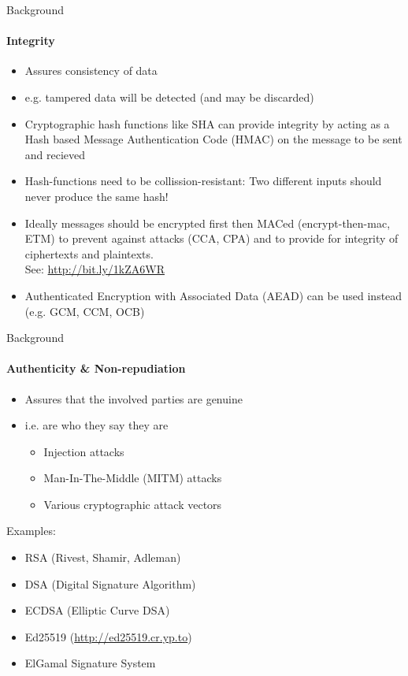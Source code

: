 \documentclass[hyperref={draft}]{beamer}
\begin{document}
\begin{frame}{Background}
  \framesubtitle{Integrity}
  \begin{itemize}
    \item Assures consistency of data
    \item e.g. tampered data will be detected (and may be discarded)
    \item Cryptographic hash functions like SHA can provide integrity by acting as a Hash based Message Authentication Code (HMAC) on the message to be sent and recieved
    \item Hash-functions need to be collission-resistant: Two different inputs should never produce the same hash!
    \item Ideally messages should be encrypted first then MACed (encrypt-then-mac, ETM) to prevent against attacks (CCA, CPA) and to provide for integrity of ciphertexts and plaintexts.\\
    See: \url{http://bit.ly/1kZA6WR}
    \item Authenticated Encryption with Associated Data (AEAD) can be used instead (e.g. GCM, CCM, OCB)
  \end{itemize}
\end{frame}

\begin{frame}{Background}
  \framesubtitle{Authenticity \& Non-repudiation}
  \begin{itemize}
    \item Assures that the involved parties are genuine
    \item i.e. are who they say they are
    \begin{itemize}
      \item Injection attacks
      \item Man-In-The-Middle (MITM) attacks
      \item Various cryptographic attack vectors
    \end{itemize}
  \end{itemize}
  Examples:
  \begin{itemize}
    \item RSA (Rivest, Shamir, Adleman)
    \item DSA (Digital Signature Algorithm)
    \item ECDSA (Elliptic Curve DSA)
    \item Ed25519 (\url{http://ed25519.cr.yp.to})
    \item ElGamal Signature System
  \end{itemize}
\end{frame}
\end{document}
